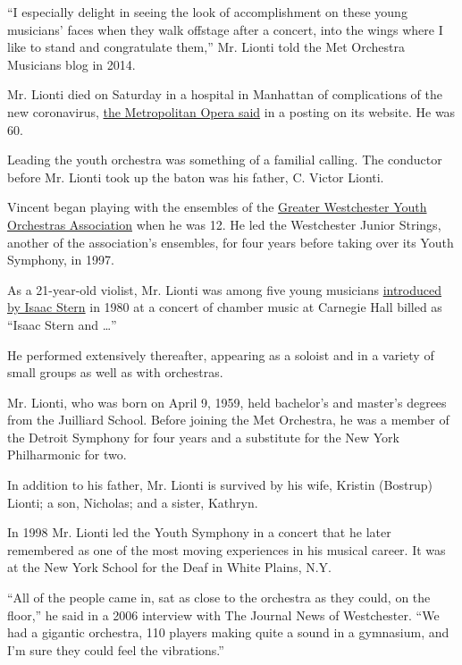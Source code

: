 ``I especially delight in seeing the look of accomplishment on these
young musicians' faces when they walk offstage after a concert, into the
wings where I like to stand and congratulate them,'' Mr. Lionti told the
Met Orchestra Musicians blog in 2014.

Mr. Lionti died on Saturday in a hospital in Manhattan of complications
of the new coronavirus,
\href{https://www.metopera.org/user-information/vincent-lionti/}{the
Metropolitan Opera said} in a posting on its website. He was 60.

Leading the youth orchestra was something of a familial calling. The
conductor before Mr. Lionti took up the baton was his father, C. Victor
Lionti.

Vincent began playing with the ensembles of the
\href{https://www.gwyoa.org/home}{Greater Westchester Youth Orchestras
Association} when he was 12. He led the Westchester Junior Strings,
another of the association's ensembles, for four years before taking
over its Youth Symphony, in 1997.

As a 21-year-old violist, Mr. Lionti was among five young musicians
\href{https://www.nytimes.com/1980/11/03/archives/chamber-stern-leads-young-group.html?searchResultPosition=1}{introduced
by Isaac Stern} in 1980 at a concert of chamber music at Carnegie Hall
billed as ``Isaac Stern and \ldots{}''

He performed extensively thereafter, appearing as a soloist and in a
variety of small groups as well as with orchestras.

Mr. Lionti, who was born on April 9, 1959, held bachelor's and master's
degrees from the Juilliard School. Before joining the Met Orchestra, he
was a member of the Detroit Symphony for four years and a substitute for
the New York Philharmonic for two.

In addition to his father, Mr. Lionti is survived by his wife, Kristin
(Bostrup) Lionti; a son, Nicholas; and a sister, Kathryn.

In 1998 Mr. Lionti led the Youth Symphony in a concert that he later
remembered as one of the most moving experiences in his musical career.
It was at the New York School for the Deaf in White Plains, N.Y.

``All of the people came in, sat as close to the orchestra as they
could, on the floor,'' he said in a 2006 interview with The Journal News
of Westchester. ``We had a gigantic orchestra, 110 players making quite
a sound in a gymnasium, and I'm sure they could feel the vibrations.''

